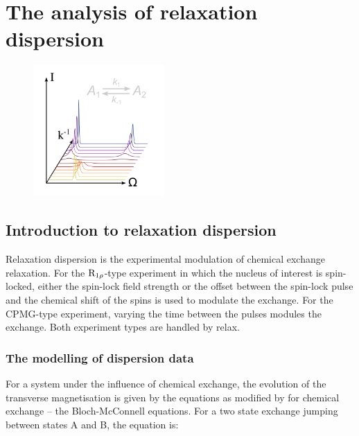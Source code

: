 
\chapter[Relaxation dispersion]{The analysis of relaxation dispersion} \label{ch: relax-disp}

\begin{figure}[h]
\includegraphics[width=5cm, bb=0 0 1701 1701]{graphics/analyses/relax_disp_600x600}
\end{figure}



\section{Introduction to relaxation dispersion}

Relaxation dispersion is the experimental modulation of chemical exchange relaxation.  For the $\mathrm{R}_{1\rho}$-type experiment in which the nucleus of interest is spin-locked, either the spin-lock field strength or the offset between the spin-lock pulse and the chemical shift of the spins is used to modulate the exchange.  For the CPMG-type experiment, varying the time between the pulses modules the exchange.  Both experiment types are handled by relax.



\subsection{The modelling of dispersion data}

For a system under the influence of chemical exchange, the evolution of the transverse magnetisation is given by the \citet{Bloch46} equations as modified by \citet{McConnell58} for chemical exchange -- the Bloch-McConnell equations.
For a two state exchange jumping between states A and B, the equation is:

